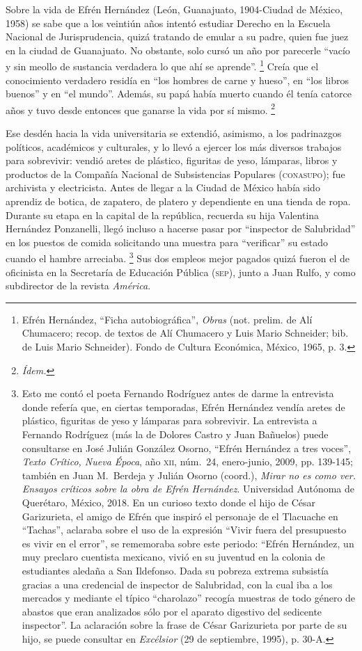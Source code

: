 \documentclass[14pt,twoside,final]{extbook} %
\let\oldfootnote\footnote
\renewcommand\footnote[1]{%
\oldfootnote{\hspace{1mm}#1}}
\begin{document}
Sobre la vida de Efrén Hernández (León, Guanajuato, 1904-Ciudad de México, 1958) se sabe que a los veintiún años intentó estudiar Derecho en la Escuela Nacional de Jurisprudencia, quizá tratando de emular a su padre, quien fue juez en la ciudad de Guanajuato. No obstante, solo cursó un año por parecerle ``vacío y sin meollo de sustancia verdadera lo que ahí se aprende''.\footnote{Efrén Hernández, ``Ficha autobiográfica'', \emph{Obras} (not. prelim. de Alí Chumacero; recop. de textos de Alí Chumacero y Luis Mario Schneider; bib. de Luis Mario Schneider). Fondo de Cultura Económica, México, 1965, p. 3.} Creía que el conocimiento verdadero residía en ``los hombres de carne y hueso'', en ``los libros buenos'' y en ``el mundo''. Además, su papá había muerto cuando él tenía catorce años y tuvo desde entonces que ganarse la vida por sí mismo.\footnote{\em Ídem.}

Ese desdén hacia la vida universitaria se extendió, asimismo, a los padrinazgos políticos, académicos y culturales, y lo llevó a ejercer los más diversos trabajos para sobrevivir: vendió aretes de plástico, figuritas de yeso, lámparas, libros y productos de la Compañía Nacional de Subsistencias Populares (\textsc{conasupo}); fue archivista y electricista. Antes de llegar a la Ciudad de México había sido aprendiz de botica, de zapatero, de platero y dependiente en una tienda de ropa. Durante su etapa en la capital de la república, recuerda su hija Valentina Hernández Ponzanelli, llegó incluso a hacerse pasar por ``inspector de Salubridad'' en los puestos de comida solicitando una muestra para ``verificar'' su estado cuando el hambre arreciaba.\footnote{Esto me contó el poeta Fernando Rodríguez antes de darme la entrevista donde refería que, en ciertas temporadas, Efrén Hernández vendía aretes de plástico, figuritas de yeso y lámparas para sobrevivir. La entrevista a Fernando Rodríguez (más la de Dolores Castro y Juan Bañuelos) puede consultarse en José Julián González Osorno, ``Efrén Hernández a tres voces'', \emph{Texto Crítico, Nueva Época}, año \textsc{xii}, núm.~24, enero-junio, 2009, pp. 139-145; también en Juan M.~Berdeja y Julián Osorno (coord.), \emph{Mirar no es como ver. Ensayos críticos sobre la obra de Efrén Hernández}. Universidad Autónoma de Querétaro, México, 2018. En un curioso texto donde el hijo de César Garizurieta, el amigo de Efrén que inspiró el personaje de el Tlacuache en ``Tachas'', aclaraba sobre el uso de la expresión ``Vivir fuera del presupuesto es vivir en el error'', se rememoraba sobre este periodo: ``Efrén Hernández, un muy preclaro cuentista mexicano, vivió en su juventud en la colonia de estudiantes aledaña a San Ildefonso. Dada su pobreza extrema subsistía gracias a una credencial de inspector de Salubridad, con la cual iba a los mercados y mediante el típico ``charolazo'' recogía muestras de todo género de abastos que eran analizados sólo por el aparato digestivo del sedicente inspector''. La aclaración sobre la frase de César Garizurieta por parte de su hijo, se puede consultar en \emph{Excélsior} (29 de septiembre, 1995), p. 30-A.} Sus dos empleos mejor pagados quizá fueron el de oficinista en la Secretaría de Educación Pública (\textsc{sep}), junto a Juan Rulfo, y como subdirector de la revista \emph{América}.
\end{document}
